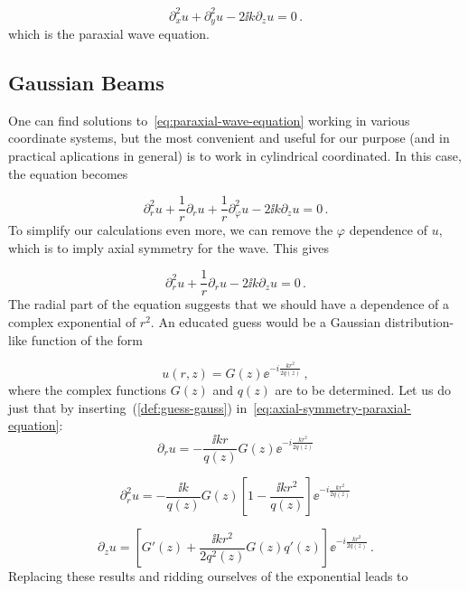 \documentclass[12pt, class=report, crop=false]{standalone}
\begin{document}
\begin{equation}
  \label{eq:paraxial-wave-equation}
  \partial_x^2 u+ \partial_y^2 u -2 \ii k \partial_z u = 0 \,.
\end{equation}
which is the paraxial wave equation.

\subsection{Gaussian Beams}

One can find solutions to~\cref{eq:paraxial-wave-equation} working in various coordinate systems, but the most convenient and useful for our purpose (and in practical aplications in general) is to work in cylindrical coordinated. In this case, the equation becomes

\begin{equation}
  \partial_r^2 u +\frac{1}{r} \partial_r u + \frac{1}{r} \partial_\varphi^2 u - 2 \ii k \partial_z u = 0 \,.
\end{equation}
To simplify our calculations even more, we can remove the \(\varphi\) dependence of \(u\), which is to imply axial symmetry for the wave. This gives

\begin{equation}
  \label{eq:axial-symmetry-paraxial-equation}
  \partial_r^2 u +\frac{1}{r} \partial_r u- 2 \ii k \partial_z u = 0 \,.
\end{equation}
The radial part of the equation suggests that we should have a dependence of a complex exponential of \(r^2\). An educated guess would be a Gaussian distribution-like function of the form

\begin{equation}
  \label{def:guess-gauss}
  u(r,z) = G(z) \ee^{-i\frac{kr^2}{2q(z)}} \,,
\end{equation}
where the complex functions \(G(z)\) and \(q(z)\) are to be determined. Let us do just that by inserting~(\ref{def:guess-gauss}) in~\cref{eq:axial-symmetry-paraxial-equation}:
\begin{equation*}
  \partial_r u = - \frac{\ii k r}{q(z)}G(z) \ee^{-i\frac{kr^2}{2q(z)}}
\end{equation*}

\begin{equation*}
  \partial_r^2 u =- \frac{\ii k}{q(z)}G(z) \left[1 - \frac{\ii k r^2}{q(z)} \right]\ee^{-i\frac{kr^2}{2q(z)}}
\end{equation*}

\begin{equation*}
  \partial_z u = \left[G'(z) + \frac{\ii k r^2}{2 q^2 (z)} G(z) q'(z)\right] \ee^{-i\frac{kr^2}{2q(z)}} \,.
\end{equation*}
Replacing these results and ridding ourselves of the exponential leads to
\end{document}
